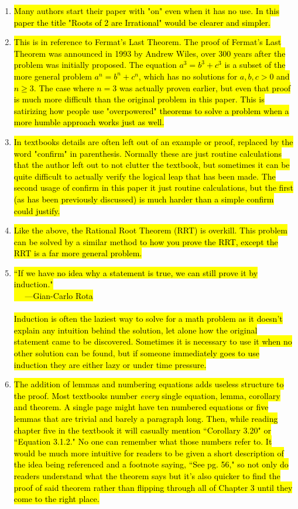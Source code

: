 \documentclass{article}
\begin{document}
	\begin{enumerate}
		\item {}\hl{Many authors start their paper with "on" even when it has no use. In this paper the title "Roots of 2 are Irrational" would be clearer and simpler.}
		\item {}\hl{This is in reference to Fermat's Last Theorem. The proof of Fermat's Last Theorem was announced in 1993 by Andrew Wiles, over 300 years after the problem was initially proposed. The equation $a^3 = b^3 + c^3$ is a subset of the more general problem $a^n = b^n + c^n$, which has no solutions for $a, b, c > 0$ and $n \ge 3$. The case where $n=3$ was actually proven earlier, but even that proof is much more difficult than the original problem in this paper. This is satirizing how people use "overpowered" theorems to solve a problem when a more humble approach works just as well.}
		\item {}\hl{In textbooks details are often left out of an example or proof, replaced by the word "confirm" in parenthesis. Normally these are just routine calculations that the author left out to not clutter the textbook, but sometimes it can be quite difficult to actually verify the logical leap that has been made. The second usage of confirm in this paper it just routine calculations, but the first (as has been previously discussed) is much harder than a simple confirm could justify.}
		\item {}\hl{Like the above, the Rational Root Theorem (RRT) is overkill. This problem can be solved by a similar method to how you prove the RRT, except the RRT is a far more general problem.}
		\item {}\hl{``If we have no idea why a statement is true, we can still prove it by induction."\mbox{}\\
		$\quad$ ---Gian-Carlo Rota}\mbox{}\\ \mbox{}\\
		\hl{Induction is often the laziest way to solve for a math problem as it doesn't explain any intuition behind the solution, let alone how the original statement came to be discovered. Sometimes it is necessary to use it when no other solution can be found, but if someone immediately goes to use induction they are either lazy or under time pressure.}
		\item {}\hl{The addition of lemmas and numbering equations adds useless structure to the proof. Most textbooks number \emph{every} single equation, lemma, corollary and theorem. A single page might have ten numbered equations or five lemmas that are trivial and barely a paragraph long. Then, while reading chapter five in the textbook it will casually mention ``Corollary 3.20" or ``Equation 3.1.2." No one can remember what those numbers refer to. It would be much more intuitive for readers to be given a short description of the idea being referenced and a footnote saying, ``See pg. 56," so not only do readers understand what the theorem says but it's also quicker to find the proof of said theorem rather than flipping through all of Chapter 3 until they come to the right place.}\mbox{}\\ \mbox{}\\

\end{enumerate}
\end{document}
